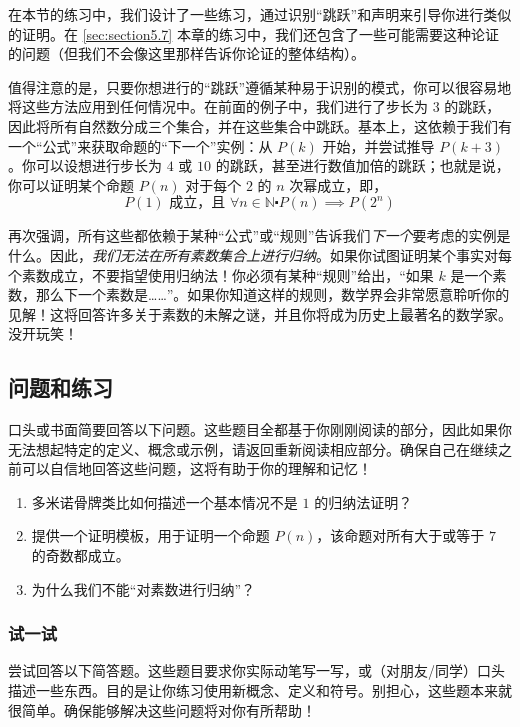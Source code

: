 在本节的练习中，我们设计了一些练习，通过识别``跳跃''和声明来引导你进行类似的证明。在 \ref{sec:section5.7} 本章的练习中，我们还包含了一些可能需要这种论证的问题（但我们不会像这里那样告诉你论证的整体结构）。

值得注意的是，只要你想进行的``跳跃''遵循某种易于识别的模式，你可以很容易地将这些方法应用到任何情况中。在前面的例子中，我们进行了步长为 $3$ 的跳跃，因此将所有自然数分成三个集合，并在这些集合中跳跃。基本上，这依赖于我们有一个``公式''来获取命题的``下一个''实例：从 $P(k)$ 开始，并尝试推导 $P(k + 3)$。你可以设想进行步长为 $4$ 或 $10$ 的跳跃，甚至进行数值加倍的跳跃；也就是说，你可以证明某个命题 $P(n)$ 对于每个 $2$ 的 $n$ 次幂成立，即，
\[P(1) \text{ 成立，且 } \forall n \in \mathbb{N} \centerdot P(n) \implies P(2^n)\]

再次强调，所有这些都依赖于某种``公式''或``规则''告诉我们\emph{下一个}要考虑的实例是什么。因此，\emph{我们无法在所有素数集合上进行归纳}。如果你试图证明某个事实对每个素数成立，不要指望使用归纳法！你必须有某种``规则''给出，``如果 $k$ 是一个素数，那么下一个素数是……''。如果你知道这样的规则，数学界会非常愿意聆听你的见解！这将回答许多关于素数的未解之谜，并且你将成为历史上最著名的数学家。没开玩笑！

\subsection{问题和练习}\label{sec:section5.3.4}

口头或书面简要回答以下问题。这些题目全都基于你刚刚阅读的部分，因此如果你无法想起特定的定义、概念或示例，请返回重新阅读相应部分。确保自己在继续之前可以自信地回答这些问题，这将有助于你的理解和记忆！

\begin{enumerate}[label=(\arabic*)]
    \item 多米诺骨牌类比如何描述一个基本情况不是 $1$ 的归纳法证明？
    \item 提供一个证明模板，用于证明一个命题 $P(n)$，该命题对所有大于或等于 $7$ 的奇数都成立。
    \item 为什么我们不能``对素数进行归纳''？
\end{enumerate}

\subsubsection*{试一试}

尝试回答以下简答题。这些题目要求你实际动笔写一写，或（对朋友/同学）口头描述一些东西。目的是让你练习使用新概念、定义和符号。别担心，这些题本来就很简单。确保能够解决这些问题将对你有所帮助！

